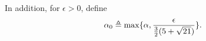 In addition, for \(  \epsilon > 0  \), define
\begin{gather}
\label{eqn:notations:alpha_0:def}
  \alpha_{0} \triangleq \max \{ \alpha, \frac{\epsilon}{\frac{3}2(5+\sqrt{21})} \}
.\end{gather}
%
